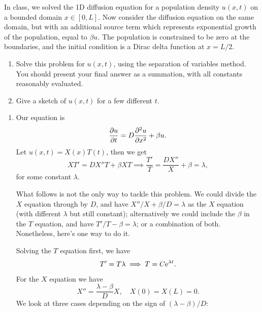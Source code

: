 \documentclass[a4paper, 12pt]{article}
\begin{document}
\begin{enumerate}[label={\bf \arabic{*}.\;}, ref={\arabic{*}},itemsep=3ex, left=0ex]
{    }


    {
      In class, we solved the 1D diffusion equation for a population density $u(x,t)$ on a bounded domain $x \in [0,L]$. Now consider the diffusion equation on the same domain, but with an additional source term which represents exponential growth of the population, equal to $\beta u$. The population is constrained to be zero at the boundaries, and the initial condition is a Dirac delta function at $x=L/2$.
      \begin{enumerate}[label=(\alph*)]
        \item    Solve this problem for $u(x,t)$, using the separation of variables method. You should present your final answer as a summation, with all constants reasonably evaluated.

        \item Give a sketch of $u(x,t)$ for a few different $t$.
      \end{enumerate}
    }
    {
      \begin{enumerate}[label=(\alph*)]
        \item
          Our equation is
          \begin{equation}
            \pd{u}{t} = D\pdd{u}{x} + \beta u.
          \end{equation}
          Let $u(x,t) = X(x)T(t)$, then we get
          \begin{equation}
            XT' = DX''T+\beta XT \implies \frac{T'}{T} = \frac{DX''}{X}+\beta = \lambda,
          \end{equation}
          for some constant $\lambda$.

          What follows is not the only way to tackle this problem. We could divide the $X$ equation through by $D$, and have $X''/X + \beta/D = \lambda$ as the $X$ equation (with different $\lambda$ but still constant); alternatively we could include the $\beta$ in the $T$ equation, and have $T'/T - \beta = \lambda$; or a combination of both. Nonetheless, here's one way to do it.

          Solving the $T$ equation first, we have
          \begin{equation}
            T'=T\lambda \implies T=C\mathrm{e}^{\lambda t}.
          \end{equation}
          For the $X$ equation we have
          \begin{equation}
            X'' = \frac{\lambda-\beta}{D}X, \quad X(0) = X(L) = 0.
          \end{equation}
          We look at three cases depending on the sign of $(\lambda-\beta)/D$:


\end{enumerate}}
\end{enumerate}
\end{document}
